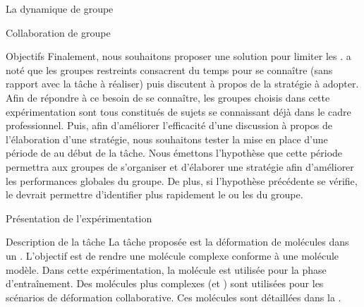 \documentclass[myfrancais,ngerman,english,frenchb]{mythesis}
\begin{document}
\begin{mychapter}{La dynamique de groupe}
\begin{mysection}{Collaboration de groupe}
\begin{mysubsection}{Objectifs}
				Finalement, nous souhaitons proposer une solution pour limiter les .
				 a noté que les groupes restreints consacrent du temps pour se connaître (sans rapport avec la tâche à réaliser) puis discutent à propos de la stratégie à adopter.
				Afin de répondre à ce besoin de se connaître, les groupes choisis dans cette expérimentation sont tous constitués de sujets se connaissant déjà dans le cadre professionnel.
				Puis, afin d'améliorer l'efficacité d'une discussion à propos de l'élaboration d'une stratégie, nous souhaitons tester la mise en place d'une période de \mybrainstorming au début de la tâche.
				Nous émettons l'hypothèse que cette période permettra aux groupes de s'organiser et d'élaborer une stratégie afin d'améliorer les performances globales du groupe.
				De plus, si l'hypothèse précédente se vérifie, le \mybrainstorming devrait permettre d'identifier plus rapidement le ou les  du groupe.
			\end{mysubsection}
		\end{mysection}
		\begin{mysection}{Présentation de l'expérimentation}
			\begin{mysubsection}{Description de la tâche}
				La tâche proposée est la déformation de molécules dans un .
				L'objectif est de rendre une molécule complexe conforme à une molécule modèle.
				Dans cette expérimentation, la molécule \myTRPCAGE est utilisée pour la phase d'entraînement.
				Des molécules plus complexes (\myPrion et \myUbiquitin) sont utilisées pour les scénarios de déformation collaborative.
				Ces molécules sont détaillées dans la .


\end{mysubsection}
\end{mysection}
\end{mychapter}
\end{document}
